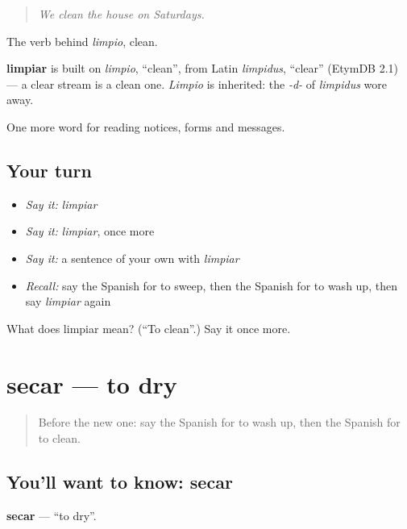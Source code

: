 \begin{quote}
\emph{We clean the house on Saturdays.}
\end{quote}

The verb behind \emph{limpio}, clean.

\begin{cousinweb}
\textbf{limpiar} is built on \emph{limpio}, \textquotedblleft{}clean\textquotedblright{}, from Latin \emph{limpidus}, \textquotedblleft{}clear\textquotedblright{} (EtymDB 2.1) — a clear stream is a clean one. \emph{Limpio} is inherited: the \emph{-d-} of \emph{limpidus} wore away.
\end{cousinweb}

\begin{grammarlens}[title={What you've built}]
One more word for reading notices, forms and messages.
\end{grammarlens}

\subsection*{Your turn}
\begin{itemize}
\raggedright
  \item \emph{Say it:} \emph{limpiar}
  \item \emph{Say it:} \emph{limpiar}, once more
  \item \emph{Say it:} a sentence of your own with \emph{limpiar}
  \item \emph{Recall:} say the Spanish for to sweep, then the Spanish for to wash up, then say \emph{limpiar} again
\end{itemize}

\begin{tcolorbox}[breakable,colback=teal!4,colframe=teal!35!black,title={Before you move on}]
What does limpiar mean? (\textquotedblleft{}To clean\textquotedblright{}.) Say it once more.
\end{tcolorbox}
\section[secar]{secar — to dry}

\label{lesson:ES-C485-secar}



\begin{quote}
Before the new one: say the Spanish for to wash up, then the Spanish for to clean.
\end{quote}

\subsection*{You'll want to know: secar}
\textbf{secar} — \textquotedblleft{}to dry\textquotedblright{}.

